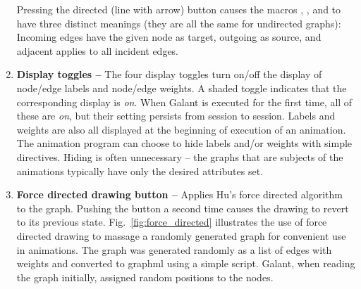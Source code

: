 \begin{enumerate}
Pressing the directed (line with arrow) button causes the macros
, , and 
to have three distinct meanings (they are all the same for undirected graphs):
Incoming edges have the given node as target, outgoing as source, and adjacent applies to all incident edges.

\item
\textbf{Display toggles --}
The four display toggles turn on/off the display of node/edge labels and node/edge weights.
A shaded toggle indicates that the corresponding display is \emph{on}.
When Galant is executed for the first time, all of these are \emph{on},
but their setting persists from session to session.
Labels and weights are also all displayed at the beginning of execution of
an animation.
The animation program can choose to hide labels and/or weights with simple
directives.
Hiding is often unnecessary -- the graphs that are subjects of the animations
typically have only the desired attributes set.

\item
\textbf{Force directed drawing button -- }
Applies Hu's force directed algorithm~\cite{2006-Mathematica-Hu} to the graph.
Pushing the button a second time causes the drawing to revert to its previous state.
Fig.~\ref{fig:force_directed} illustrates the use of force directed drawing
to massage a randomly generated graph for convenient use in animations.
The graph was generated randomly as a list of edges with weights
and converted to graphml using a simple script.
Galant, when reading the graph initially, assigned random positions to the nodes.

\end{enumerate}


